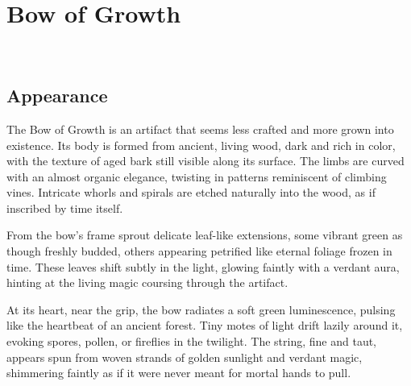 \ItemCategory{}
\ItemSubCategory{}
\ItemFolder{}

\chapter*{Bow of Growth}
\\

%

\section*{Appearance}
{\entryfont The Bow of Growth is an artifact that seems less crafted and more grown into existence. Its body is formed from ancient, living wood, dark and rich in color, with the texture of aged bark still visible along its surface. The limbs are curved with an almost organic elegance, twisting in patterns reminiscent of climbing vines. Intricate whorls and spirals are etched naturally into the wood, as if inscribed by time itself.

From the bow's frame sprout delicate leaf-like extensions, some vibrant green as though freshly budded, others appearing petrified like eternal foliage frozen in time. These leaves shift subtly in the light, glowing faintly with a verdant aura, hinting at the living magic coursing through the artifact.

At its heart, near the grip, the bow radiates a soft green luminescence, pulsing like the heartbeat of an ancient forest. Tiny motes of light drift lazily around it, evoking spores, pollen, or fireflies in the twilight. The string, fine and taut, appears spun from woven strands of golden sunlight and verdant magic, shimmering faintly as if it were never meant for mortal hands to pull.}
